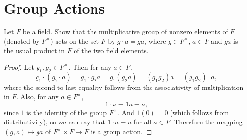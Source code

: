 \section{Group Actions}

 Let $F$ be a field. Show that the multiplicative group of
nonzero elements of $F$ (denoted by $F^\times$) acts on the set $F$ by
$g\cdot a = ga$, where $g\in F^\times$, $a\in F$ and $ga$ is the usual
product in $F$ of the two field elements.
\begin{proof}
  Let $g_1,g_2\in F^\times$. Then for any $a\in F$,
  \begin{equation*}
    g_1\cdot(g_2\cdot a) = g_1\cdot g_2a = g_1(g_2a) = (g_1g_2)a
    = (g_1g_2)\cdot a,
  \end{equation*}
  where the second-to-last equality follows from the associativity of
  multiplication in $F$. Also, for any $a\in F^\times$,
  \begin{equation*}
    1\cdot a = 1a = a,
  \end{equation*}
  since $1$ is the identity of the group $F^\times$. And $1(0) = 0$
  (which follows from distributivity), so we can say that
  $1\cdot a = a$ for all $a\in F$. Therefore the mapping
  $(g, a)\mapsto ga$ of $F^\times\times F\to F$ is a group action.
\end{proof}
